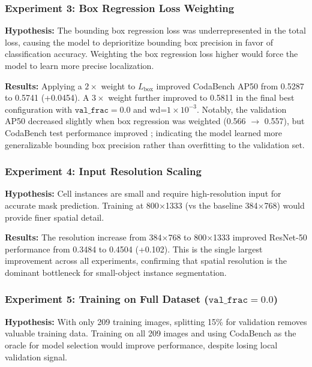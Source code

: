 \documentclass[12pt, a4paper]{article}
\begin{document}
\subsubsection{Experiment 3: Box Regression Loss Weighting}
\textbf{Hypothesis:} The bounding box regression loss was underrepresented in the total loss, causing the model to deprioritize bounding box precision in favor of classification accuracy. Weighting the box regression loss higher would force the model to learn more precise localization.

\textbf{Results:} Applying a $2\times$ weight to $L_{\text{box}}$ improved CodaBench AP50 from 0.5287 to 0.5741 (+0.0454). A $3\times$ weight further improved to 0.5811 in the final best configuration with $\texttt{val\_frac}=0.0$ and wd=$1 \times 10^{-3}$. Notably, the validation AP50 decreased slightly when box regression was weighted (0.566 $\rightarrow$ 0.557), but CodaBench test performance improved ; indicating the model learned more generalizable bounding box precision rather than overfitting to the validation set.

\subsubsection{Experiment 4: Input Resolution Scaling}
\textbf{Hypothesis:} Cell instances are small and require high-resolution input for accurate mask prediction. Training at 800$\times$1333 (vs the baseline 384$\times$768) would provide finer spatial detail.

\textbf{Results:} The resolution increase from 384$\times$768 to 800$\times$1333 improved ResNet-50 performance from 0.3484 to 0.4504 (+0.102). This is the single largest improvement across all experiments, confirming that spatial resolution is the dominant bottleneck for small-object instance segmentation.

\subsubsection{Experiment 5: Training on Full Dataset ($\texttt{val\_frac}=0.0$)}
\textbf{Hypothesis:} With only 209 training images, splitting 15\% for validation removes valuable training data. Training on all 209 images and using CodaBench as the oracle for model selection would improve performance, despite losing local validation signal.
\end{document}
